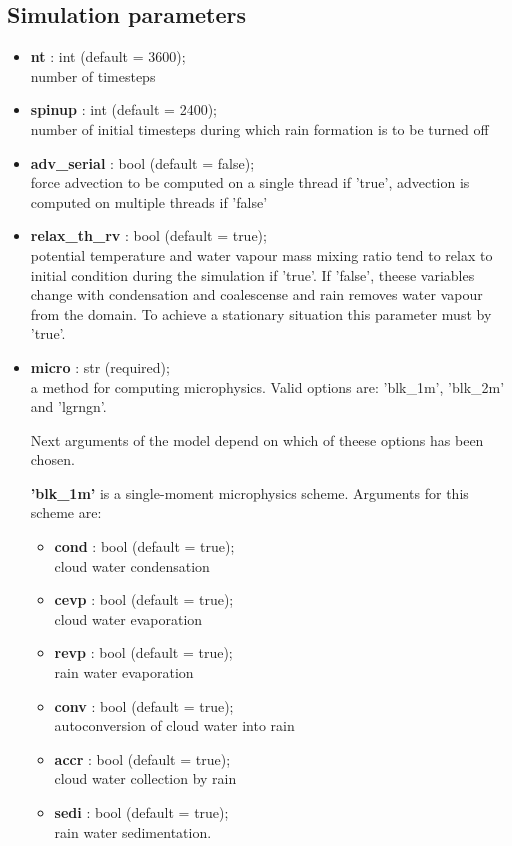 \documentclass[11pt]{article}
\begin{document}
\subsection{Simulation parameters}

\begin{itemize}
\item \textbf{nt} : int (default = 3600);\\ number of timesteps
\item \textbf{spinup} : int (default = 2400);\\ number of initial timesteps during which rain formation is to be turned off
\item \textbf{adv\_serial} : bool (default = false);\\ force advection to be computed on a single thread if 'true', advection is computed on multiple threads if 'false'
\item \textbf{relax\_th\_rv} : bool (default = true);\\ potential temperature and water vapour mass mixing ratio tend to relax to initial condition during the simulation if 'true'. If 'false', theese variables change with condensation and coalescense and rain removes water vapour from the domain. To achieve a stationary situation this parameter must by 'true'.
\item \textbf{micro} : str (required);\\ a method for computing microphysics. Valid options are: 'blk\_1m', 'blk\_2m' and 'lgrngn'.
 
Next arguments of the model depend on which of theese options has been chosen.

\textbf{'blk\_1m'} is a single-moment microphysics scheme. Arguments for this scheme are: 
\begin{itemize}[label=$\bullet$]
\item \textbf{cond} : bool (default = true); \\ cloud water condensation
\item \textbf{cevp} : bool (default = true); \\ cloud water evaporation
\item \textbf{revp} : bool (default = true); \\ rain water evaporation
\item \textbf{conv} : bool (default = true); \\ autoconversion of cloud water into rain
\item \textbf{accr} : bool (default = true); \\ cloud water collection by rain
\item \textbf{sedi} : bool (default = true); \\ rain water sedimentation.
\end{itemize}



\end{itemize}
\end{document}
